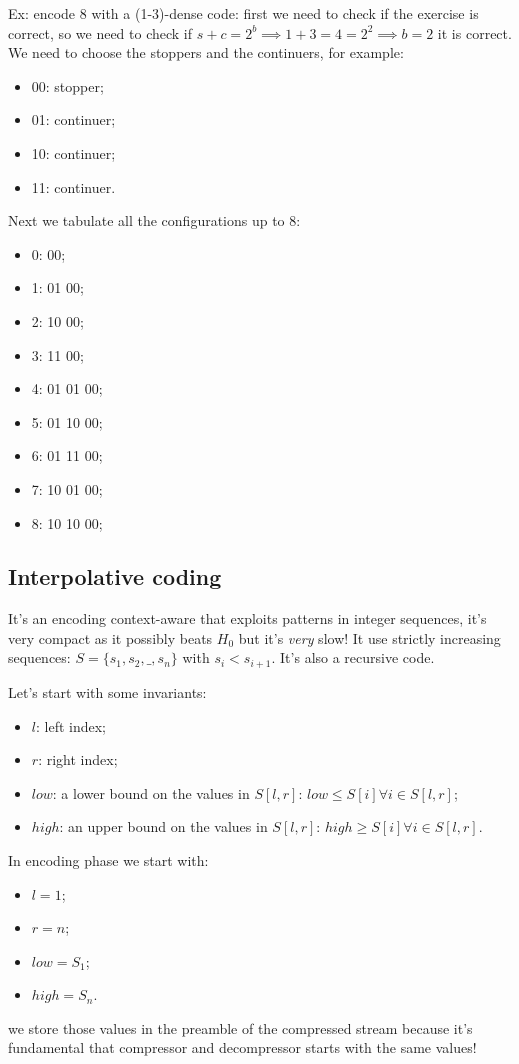 Ex: encode 8 with a (1-3)-dense code: first we need to check if the exercise is correct, so we need to check if $s+c = 2^b \implies 1+3 = 4 = 2^2 \implies b = 2$ it is correct.
We need to choose the stoppers and the continuers, for example:
\begin{itemize}
    \item 00: stopper;
    \item 01: continuer;
    \item 10: continuer;
    \item 11: continuer.
\end{itemize}
Next we tabulate all the configurations up to 8:
\begin{itemize}
    \item 0: 00;
    \item 1: 01 00;
    \item 2: 10 00;
    \item 3: 11 00;
    \item 4: 01 01 00;
    \item 5: 01 10 00;
    \item 6: 01 11 00;
    \item 7: 10 01 00;
    \item 8: 10 10 00;
\end{itemize}


\subsection{Interpolative coding}
It's an encoding context-aware that exploits patterns in integer sequences, it's very compact as it possibly beats $H_0$ but it's \emph{very} slow!
It use strictly increasing sequences: $S = \{ s_1, s_2, \_, s_n \}$ with $s_i < s_{i+1}$.
It's also a recursive code.

Let's start with some invariants:
\begin{itemize}
    \item $l$: left index;
    \item $r$: right index;
    \item $low$: a lower bound on the values in $S[l, r]$: $low \leq S[i] \forall i \in S[l,r]$;
    \item $high$: an upper bound on the values in $S[l, r]$: $high \geq S[i] \forall i \in S[l,r]$.
\end{itemize}

In encoding phase we start with:
\begin{itemize}
    \item $l = 1$;
    \item $r = n$;
    \item $low = S_1$;
    \item $high = S_n$.
\end{itemize}
we store those values in the preamble of the compressed stream because it's fundamental that compressor and decompressor starts with the same values!


